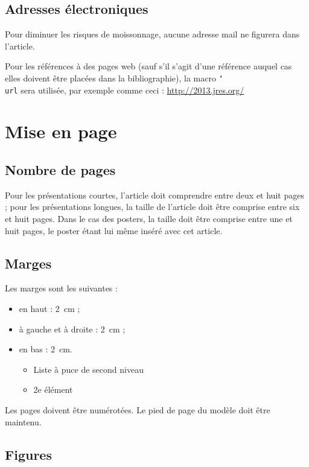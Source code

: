 \documentclass[city=Montpellier,year=2013]{jres}
\begin{document}
\subsection{Adresses électroniques}

Pour diminuer les risques de moissonnage, aucune adresse mail ne
figurera dans l'article. 

Pour les références à des pages web (sauf s'il s'agit d'une référence
auquel cas elles doivent être placées dans la bibliographie), la macro
\texttt{\char`\\url} sera utilisée, par exemple comme ceci :
\url{http://2013.jres.org/}

\section{Mise en page}

\subsection{Nombre de pages}

Pour les présentations courtes, l'article doit comprendre entre deux
et huit pages ; pour les présentations longues, la taille de l'article
doit être comprise entre six et huit pages. Dans le cas des posters,
la taille doit être comprise entre une et huit pages, le poster étant
lui même inséré avec cet article.

\subsection{Marges}

Les marges sont les suivantes :

\begin{itemize}
    \item en haut : 2\ cm ;
    \item à gauche et à droite : 2\ cm ;
    \item en bas : 2\ cm.
	\begin{itemize}
	    \item Liste à puce de second niveau
	    \item 2e élément
	\end{itemize}
\end{itemize}

Les pages doivent être numérotées. Le pied de page du modèle doit être
maintenu.

\subsection{Figures}
\end{document}
